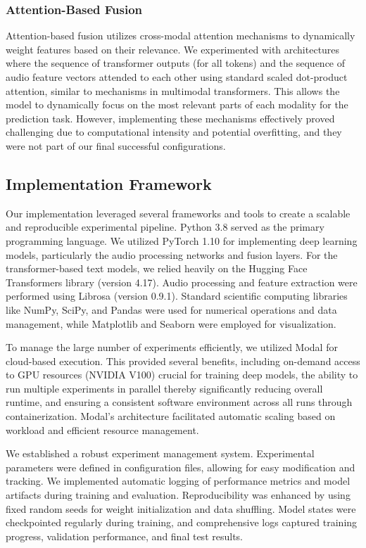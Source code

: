 \documentclass[12pt]{article}
\begin{document}
\subsubsection{Attention-Based Fusion}
Attention-based fusion utilizes cross-modal attention mechanisms to dynamically weight features based on their relevance. We experimented with architectures where the sequence of transformer outputs (for all tokens) and the sequence of audio feature vectors attended to each other using standard scaled dot-product attention, similar to mechanisms in multimodal transformers. This allows the model to dynamically focus on the most relevant parts of each modality for the prediction task. However, implementing these mechanisms effectively proved challenging due to computational intensity and potential overfitting, and they were not part of our final successful configurations.

\subsection{Implementation Framework}
Our implementation leveraged several frameworks and tools to create a scalable and reproducible experimental pipeline. Python 3.8 served as the primary programming language. We utilized PyTorch 1.10 for implementing deep learning models, particularly the audio processing networks and fusion layers. For the transformer-based text models, we relied heavily on the Hugging Face Transformers library (version 4.17). Audio processing and feature extraction were performed using Librosa (version 0.9.1). Standard scientific computing libraries like NumPy, SciPy, and Pandas were used for numerical operations and data management, while Matplotlib and Seaborn were employed for visualization.

To manage the large number of experiments efficiently, we utilized Modal for cloud-based execution. This provided several benefits, including on-demand access to GPU resources (NVIDIA V100) crucial for training deep models, the ability to run multiple experiments in parallel thereby significantly reducing overall runtime, and ensuring a consistent software environment across all runs through containerization. Modal's architecture facilitated automatic scaling based on workload and efficient resource management.

We established a robust experiment management system. Experimental parameters were defined in configuration files, allowing for easy modification and tracking. We implemented automatic logging of performance metrics and model artifacts during training and evaluation. Reproducibility was enhanced by using fixed random seeds for weight initialization and data shuffling. Model states were checkpointed regularly during training, and comprehensive logs captured training progress, validation performance, and final test results.
\end{document}
